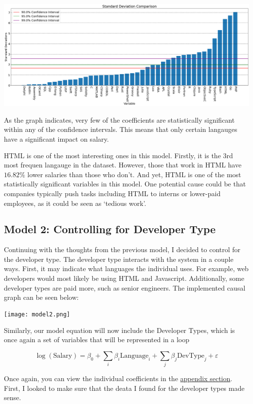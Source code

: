 \documentclass{report}
\begin{document}
\includegraphics[width=0.9\linewidth]{model1confidencelanguages.png}

\vspace{0.5in}

As the graph indicates, very few of the coefficients are statistically significant within any of the confidence intervals. This means that only certain langauges have a significant impact on salary.

HTML is one of the most interesting ones in this model. Firstly, it is the 3rd most frequen langauge in the dataset. However, those that work in HTML have $16.82\%$ lower salaries than those who don't. And yet, HTML is one of the most statistically significant variables in this model. One potential cause could be that companies typically push tasks including HTML to interns or lower-paid employees, as it could be seen as `tedious work'.

\subsection{Model 2: Controlling for Developer Type}

Continuing with the thoughts from the previous model, I decided to control for the developer type. The developer type interacts with the system in a couple ways. First, it may indicate what languages the individual uses. For example, web developers would most likely be using HTML and Javascript. Additionally, some developer types are paid more, such as senior engineers. The implemented causal graph can be seen below:

\texttt{[image: model2.png]}

Similarly, our model equation will now include the Developer Types, which is once again a set of variables that will be represented in a loop

$$\log({\text{Salary}}) = \beta_0 + \sum_i{\beta_i \text{Language}_i} + \sum_j{\beta_j \text{DevType}_j} + \varepsilon$$

Once again, you can view the individual coefficients in the \hyperref[data:model2]{appendix section}. First, I looked to make sure that the deata I found for the developer types made sense.
\end{document}
